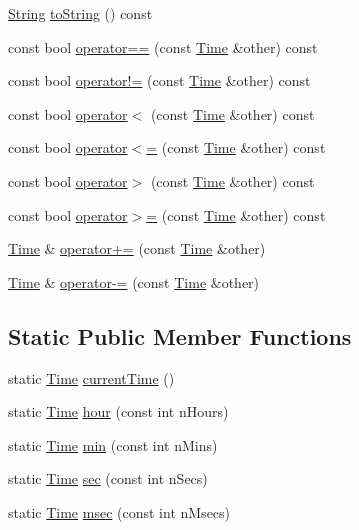 \begin{DoxyCompactItemize}
\item 
\hyperlink{classprism_1_1_string}{String} \hyperlink{classprism_1_1_time_a1bb4fbb063aff43d3640334baaea281d}{to\+String} () const 
\item 
const bool \hyperlink{classprism_1_1_time_a83609d958807bf8256c39881db7002a5}{operator==} (const \hyperlink{classprism_1_1_time}{Time} \&other) const 
\item 
const bool \hyperlink{classprism_1_1_time_aa2aba406dd4de48f602126c0b46a957a}{operator!=} (const \hyperlink{classprism_1_1_time}{Time} \&other) const 
\item 
const bool \hyperlink{classprism_1_1_time_a10289f95ed3569a03cea9ae793dc9a63}{operator$<$} (const \hyperlink{classprism_1_1_time}{Time} \&other) const 
\item 
const bool \hyperlink{classprism_1_1_time_a30638c4a54601a0d7d52b9249060fe6f}{operator$<$=} (const \hyperlink{classprism_1_1_time}{Time} \&other) const 
\item 
const bool \hyperlink{classprism_1_1_time_a4418d7b5578e62a27798cd1df1ddfd3f}{operator$>$} (const \hyperlink{classprism_1_1_time}{Time} \&other) const 
\item 
const bool \hyperlink{classprism_1_1_time_aedf46b0ebca56e0fc141dd07f98c5022}{operator$>$=} (const \hyperlink{classprism_1_1_time}{Time} \&other) const 
\item 
\hyperlink{classprism_1_1_time}{Time} \& \hyperlink{classprism_1_1_time_a0c17a09d0c0899b875588680fb99b92c}{operator+=} (const \hyperlink{classprism_1_1_time}{Time} \&other)
\item 
\hyperlink{classprism_1_1_time}{Time} \& \hyperlink{classprism_1_1_time_acfda18468af0af153873aab3f9a2ec41}{operator-\/=} (const \hyperlink{classprism_1_1_time}{Time} \&other)
\end{DoxyCompactItemize}
\subsection*{Static Public Member Functions}
\begin{DoxyCompactItemize}
\item 
static \hyperlink{classprism_1_1_time}{Time} \hyperlink{classprism_1_1_time_ae440b8eee979a64a49fd026087d8bd5a}{current\+Time} ()
\item 
static \hyperlink{classprism_1_1_time}{Time} \hyperlink{classprism_1_1_time_adc2fffc1f771980417d2f91c661dff94}{hour} (const int n\+Hours)
\item 
static \hyperlink{classprism_1_1_time}{Time} \hyperlink{classprism_1_1_time_a0af1d18ebbc757c3e731b191e0165be9}{min} (const int n\+Mins)
\item 
static \hyperlink{classprism_1_1_time}{Time} \hyperlink{classprism_1_1_time_a5c2bde2875a4195c1947a3e6fd7bbcea}{sec} (const int n\+Secs)
\item 
static \hyperlink{classprism_1_1_time}{Time} \hyperlink{classprism_1_1_time_a6d835c48733a1f245101756039441441}{msec} (const int n\+Msecs)
\end{DoxyCompactItemize}
